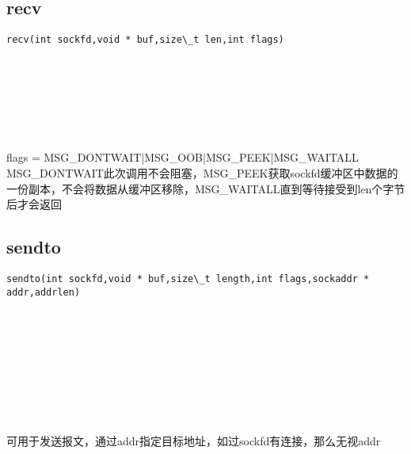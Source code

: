 \documentclass[10pt,a4paper]{article}
\begin{document}
\subsection{recv}
\begin{spacing}{2.0}
\lstset{language=C,numbers=none}
\begin{lstlisting}
recv(int sockfd,void * buf,size\_t len,int flags)
\end{lstlisting}
{\large\color[rgb]{0.2,0.4,0.6}{sockfd:}} \\
{\large\color[rgb]{0.2,0.4,0.6}{buf:}} \\
{\large\color[rgb]{0.2,0.4,0.6}{len:}} \\
{\large\color[rgb]{0.2,0.4,0.6}{flags:}}
\paragraph{ \ \ }flags = MSG\_DONTWAIT|MSG\_OOB|MSG\_PEEK|MSG\_WAITALL MSG\_DONTWAIT此次调用不会阻塞，MSG\_PEEK获取sockfd缓冲区中数据的一份副本，不会将数据从缓冲区移除，MSG\_WAITALL直到等待接受到len个字节后才会返回
\end{spacing}

\subsection{sendto}
\begin{spacing}{2.0}
\lstset{language=C,numbers=none}
\begin{lstlisting}
sendto(int sockfd,void * buf,size\_t length,int flags,sockaddr * addr,addrlen)
\end{lstlisting}
{\large\color[rgb]{0.2,0.4,0.6}{sockfd:}} \\
{\large\color[rgb]{0.2,0.4,0.6}{buf:}} \\
{\large\color[rgb]{0.2,0.4,0.6}{length:}} \\
{\large\color[rgb]{0.2,0.4,0.6}{flags:}} \\
{\large\color[rgb]{0.2,0.4,0.6}{addr:}} \\
{\large\color[rgb]{0.2,0.4,0.6}{addrlen:}}
\paragraph{ \ \ }可用于发送报文，通过addr指定目标地址，如过sockfd有连接，那么无视addr
\end{spacing}
\end{document}

